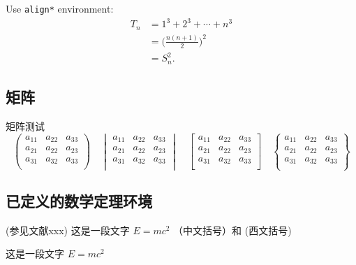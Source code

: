 Use \texttt{align*} environment:
\begin{align*}
    T_n & = 1^3 + 2^3 + \cdots + n^3         \\
        & = \biggl(\frac{n(n+1)}{2}\biggr)^2 \\
        & = S_n^2.
\end{align*}

\subsection{矩阵}
矩阵测试
\[
    \begin{pmatrix}
        a_{11} & a_{22} & a_{33} \\
        a_{21} & a_{22} & a_{23} \\
        a_{31} & a_{32} & a_{33} \\
    \end{pmatrix} \quad
    \begin{vmatrix}
        a_{11} & a_{22} & a_{33} \\
        a_{21} & a_{22} & a_{23} \\
        a_{31} & a_{32} & a_{33} \\
    \end{vmatrix} \quad
    \begin{bmatrix}
        a_{11} & a_{22} & a_{33} \\
        a_{21} & a_{22} & a_{23} \\
        a_{31} & a_{32} & a_{33} \\
    \end{bmatrix} \quad
    \begin{Bmatrix}
        a_{11} & a_{22} & a_{33} \\
        a_{21} & a_{22} & a_{23} \\
        a_{31} & a_{32} & a_{33} \\
    \end{Bmatrix}\]

\subsection{已定义的数学定理环境}

\begin{definition}[测度]
    (参见文献xxx) 这是一段文字 $E = m c^2$  （中文括号）和 (西文括号)
\end{definition}

\begin{theorem}
    这是一段文字 $E = m c^2$
\end{theorem}

